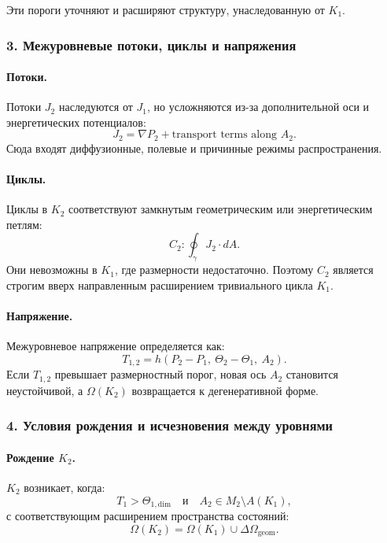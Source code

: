 Эти пороги уточняют и расширяют структуру, унаследованную от $K_1$.

\subsubsection{3. Межуровневые потоки, циклы и напряжения}

\paragraph{Потоки.}
Потоки $J_2$ наследуются от $J_1$, но усложняются из-за дополнительной
оси и энергетических потенциалов:
\[
J_2 = \nabla P_2 + \text{transport terms along } A_2.
\]
Сюда входят диффузионные, полевые и причинные режимы распространения.

\paragraph{Циклы.}
Циклы в $K_2$ соответствуют замкнутым геометрическим или энергетическим
петлям:
\[
C_2 : \oint_{\gamma} J_2 \cdot dA.
\]
Они невозможны в $K_1$, где размерности недостаточно.
Поэтому $C_2$ является строгим вверх направленным расширением тривиального
цикла $K_1$.

\paragraph{Напряжение.}
Межуровневое напряжение определяется как:
\[
T_{1,2} = h(P_2 - P_1,\ \Theta_2 - \Theta_1,\ A_2).
\]
Если $T_{1,2}$ превышает размерностный порог, новая ось $A_2$ становится
неустойчивой, а $\Omega(K_2)$ возвращается к дегенеративной форме.

\subsubsection{4. Условия рождения и исчезновения между уровнями}

\paragraph{Рождение \texorpdfstring{$K_2$}{K_2}.}
$K_2$ возникает, когда:
\[
T_1 > \Theta_{1,\mathrm{dim}}
\quad \text{и} \quad
A_2 \in M_2 \setminus A(K_1),
\]
с соответствующим расширением пространства состояний:
\[
\Omega(K_2) = \Omega(K_1) \cup \Delta\Omega_{\mathrm{geom}}.
\]

